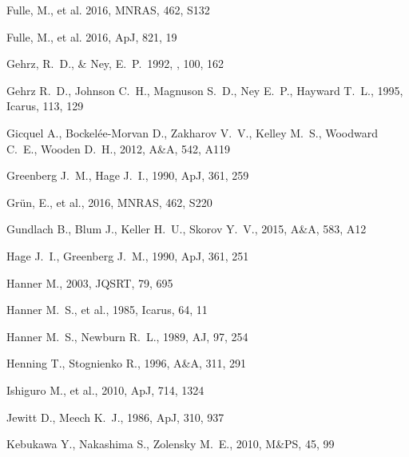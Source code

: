 \documentclass[a4paper,fleqn,usenatbib]{mnras}
\begin{document}
\begin{thebibliography}{99}
 Fulle, M., et al. 2016, MNRAS, 462, S132

 Fulle, M., et al. 2016, ApJ, 821, 19

 Gehrz, R.~D., \& Ney, E.~P.\ 1992, \icarus, 100, 162

 Gehrz R.~D., Johnson C.~H., Magnuson S.~D., Ney E.~P., Hayward T.~L., 1995, Icarus, 113, 129

 Gicquel A., Bockel{\'e}e-Morvan D., Zakharov V.~V., Kelley M.~S., Woodward C.~E., Wooden D.~H., 2012, A\&A, 542, A119

 Greenberg J.~M., Hage J.~I.,  1990, ApJ, 361, 259

 Gr{\"u}n, E.,  et al., 2016, MNRAS, 462, S220

 Gundlach B., Blum J., Keller H.~U., Skorov Y.~V., 2015, A\&A, 583, A12

 Hage J.~I., Greenberg J.~M., 1990, ApJ, 361, 251

 Hanner M., 2003, JQSRT, 79, 695

 Hanner M.~S., et al., 1985, Icarus, 64, 11

 Hanner M.~S., Newburn R.~L., 1989, AJ, 97, 254

 Henning T., Stognienko R., 1996, A\&A, 311, 291

 Ishiguro M., et al., 2010, ApJ, 714, 1324

 Jewitt D., Meech K.~J., 1986, ApJ, 310, 937

 Kebukawa Y., Nakashima S., Zolensky M.~E., 2010, M\&PS, 45, 99


\end{thebibliography}
\end{document}
